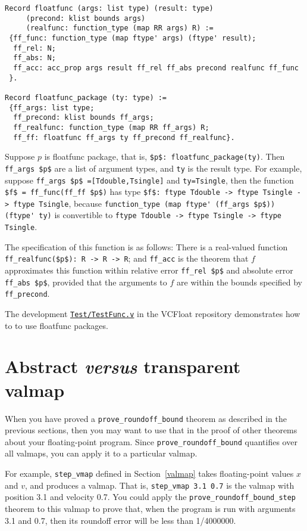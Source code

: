 \documentclass[article]{memoir}
\begin{document}
\begin{lstlisting}
Record floatfunc (args: list type) (result: type) 
     (precond: klist bounds args)
     (realfunc: function_type (map RR args) R) := 
 {ff_func: function_type (map ftype' args) (ftype' result);
  ff_rel: N;
  ff_abs: N;
  ff_acc: acc_prop args result ff_rel ff_abs precond realfunc ff_func
 }.

Record floatfunc_package (ty: type) :=
 {ff_args: list type;
  ff_precond: klist bounds ff_args;
  ff_realfunc: function_type (map RR ff_args) R;
  ff_ff: floatfunc ff_args ty ff_precond ff_realfunc}.
\end{lstlisting}
Suppose $p$ is floatfunc package, that is, \lstinline{$p$: floatfunc_package(ty)}.
Then \lstinline{ff_args $p$} are a list of argument types, and \lstinline{ty}
is the result type.  For example,
suppose \lstinline{ff_args $p$ =[Tdouble,Tsingle]} and \lstinline{ty=Tsingle},
then the function \lstinline{$f$ = ff_func(ff_ff $p$)} has type
\lstinline{$f$: ftype Tdouble -> ftype Tsingle -> ftype Tsingle},
because \lstinline{function_type (map ftype' (ff_args $p$)) (ftype' ty)}
is convertible to \lstinline{ftype Tdouble -> ftype Tsingle -> ftype Tsingle}.

The specification of this function is as follows:  There is a real-valued
function \lstinline{ff_realfunc($p$): R -> R -> R};
and \lstinline{ff_acc} is the theorem that
$f$ approximates this function within relative error \lstinline{ff_rel $p$}
and absolute error \lstinline{ff_abs $p$}, provided that the arguments
to $f$ are within the bounds specified by \lstinline{ff_precond}.

The development \href{../Test/TestFunc.v}{\lstinline{Test/TestFunc.v}} in the VCFloat repository demonstrates
how to to use floatfunc packages.


\chapter{Abstract \emph{versus} transparent valmap}

When you have proved a \lstinline{prove_roundoff_bound} theorem
as described in the previous sections, then you may want to
use that in the proof of other theorems about your floating-point
program.  Since \lstinline{prove_roundoff_bound} quantifies over
all valmaps, you can apply it to a particular valmap.

For example, \lstinline{step_vmap} defined in Section~\ref{valmap}
takes floating-point values $x$ and $v$, and produces a valmap.
That is, \lstinline{step_vmap 3.1 0.7} is the valmap with
position 3.1 and velocity 0.7.  You could apply the
\lstinline{prove_roundoff_bound_step} theorem to this valmap
to prove that, when the program is run with arguments
3.1 and 0.7, then its roundoff error will be less than 1/4000000.
\end{document}
